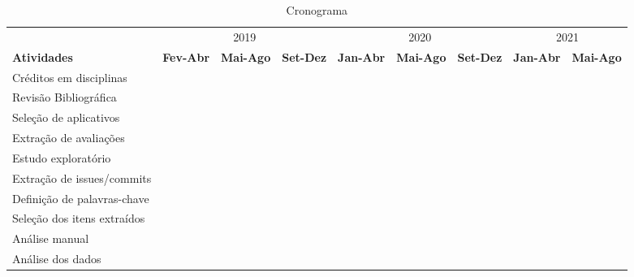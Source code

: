 \begin{table}[h] \footnotesize
\setlength{\tabcolsep}{0pt}
 \caption{Cronograma}
 \label{tab:cronograma}

\begin{tabular}{|l|c|c|c|c|c|c|c|c|}
  \cline{2-9}
  \multicolumn{1}{l|}{} & \multicolumn{3}{c|}{2019} & \multicolumn{3}{c|}{2020} & \multicolumn{2}{c|}{2021} \\
  \cline{1-9}
  \textbf{Atividades} &   
  \textbf{Fev-Abr\hspace{3pt}} &   
  \textbf{Mai-Ago\hspace{3pt}} & 
  \textbf{Set-Dez\hspace{3pt}} &
  \textbf{Jan-Abr\hspace{3pt}} &   
  \textbf{Mai-Ago\hspace{3pt}} & 
  \textbf{Set-Dez\hspace{3pt}} &
  \textbf{Jan-Abr\hspace{3pt}} &   
  \textbf{Mai-Ago\hspace{3pt}} \\ 
  \hline
  Créditos em disciplinas
  & \y & \x & \x & \x & \x  & \x & \x & \x \\
  \hline
  
  
  Revisão Bibliográfica
  & \y & \y & \y & \y & \x  & \y & \x & \x \\
  \hline
  
  
  Seleção de aplicativos
  & \x & \y & \x & \x & \x & \y & \x & \x \\
  \hline
  
  
  Extração de avaliações
  & \x & \y & \x & \x & \x  & \y & \x & \x \\
  \hline
  
  Estudo exploratório
  & \y & \y & \y & \x & \x  & \x & \x & \x \\
  \hline
  
  Extração de issues/commits
  & \x & \x & \x & \x & \x  & \y & \x & \x \\
  \hline
  
  Definição de palavras-chave 
  & \x & \y & \y & \x & \x  & \y & \x & \x \\
  \hline
  
  Seleção dos itens extraídos
  & \x & \x & \x & \x & \x  & \y & \x & \x \\
  \hline
  
  Análise manual 
  & \x & \x & \x & \x & \x  & \x & \y & \x \\
  \hline
  
  Análise dos dados
  & \x & \x & \x & \x & \x  & \x & \y & \y \\
  \hline  
  \hline
  

\end{tabular}
\end{table}

